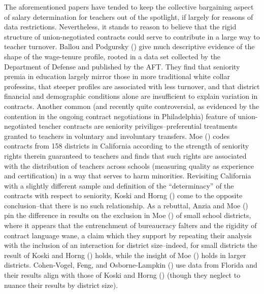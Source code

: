 The aforementioned papers have tended to keep the collective bargaining
aspect of salary determination for teachers out of the spotlight, if
largely for reasons of data restrictions. Nevertheless, it stands to
reason to believe that the rigid structure of union-negotiated contracts
could serve to contribute in a large way to teacher turnover. Ballou and
Podgursky (\citeyear{ballou}) give much descriptive
evidence of the shape of the wage-tenure profile, rooted in a data set
collected by the Department of Defense and published by the AFT. They
find that seniority premia in education largely mirror those in more
traditional white collar professins, that steeper profiles are
associated with less turnover, and that district financial and
demographic conditions alone are insufficient to explain variation in
contracts. Another common (and recently quite controversial, as
evidenced by the contention in the ongoing contract negotiations in
Philadelphia) feature of union-negotiated teacher contracts are
seniority priviliges--preferential treatments granted to teachers in
voluntary and involuntary transfers. Moe
(\citeyear{moe}) codes contracts from 158 districts
in California according to the strength of seniority rights therein
guaranteed to teachers and finds that such rights are associated with
the distribution of teachers across schools (measuring quality as
experience and certification) in a way that serves to harm minorities.
Revisiting California with a slightly different sample and definition of
the ``determinacy'' of the contracts with respect to seniority, Koski
and Horng (\citeyear{koski}) come to the opposite
conclusion--that there is no such relationship. As a rebuttal, Anzia and
Moe (\citeyear{anzia}) pin the difference in results
on the exclusion in Moe (\citeyear{moe}) of small
school districts, where it appears that the entrenchment of bureaucracy
falters and the rigidity of contract language wane, a claim which they
support by repeating their analysis with the inclusion of an interaction
for district size--indeed, for small districts the result of Koski and
Horng (\citeyear{koski}) holds, while the insight of
Moe (\citeyear{moe}) holds in larger districts.
Cohen-Vogel, Feng, and Osborne-Lampkin
(\citeyear{cohenvogel}) use data from Florida and
their results align with those of Koski and Horng
(\citeyear{koski}) (though they neglect to nuance
their results by district size).

